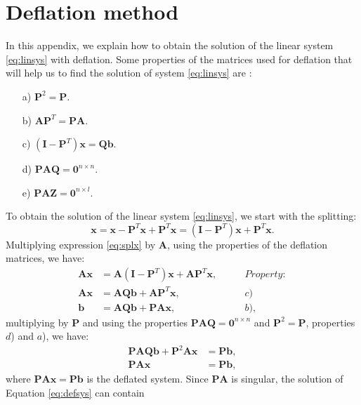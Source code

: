 \documentclass[12pt]{article}
\begin{document}
\section{Deflation method}\label{a4}
In this appendix, we explain how to obtain the solution of the linear system \eqref{eq:linsys} with deflation.
Some properties of the matrices used for deflation that will help us to find the solution of system \eqref{eq:linsys} are \cite{Tang09}:
\begin{enumerate}\label{defprop}
 \item[a)] $\mathbf{P}^2=\mathbf{P}.$
 \item[b)] $\mathbf{A}\mathbf{P}^T=\mathbf{P}\mathbf{A}.$
 \item[c)] $(\mathbf{I}-\mathbf{P}^T)\mathbf{x}=\mathbf{Q}\mathbf{b}.$
 \item[d)]$\mathbf{P}\mathbf{A}\mathbf{Q}=\mathbf{0}^{n\times n}.$
  \item[e)]$\mathbf{P}\mathbf{A}\mathbf{Z}=\mathbf{0}^{n\times l}.$
\end{enumerate}
To obtain the solution of the linear system \eqref{eq:linsys}, we start with the splitting:
\begin{equation}\label{eq:splx}
    \mathbf{x}=\mathbf{x}-\mathbf{P}^T\mathbf{x}+\mathbf{P}^T\mathbf{x}=(\mathbf{I}-\mathbf{P}^T)\mathbf{x}+\mathbf{P}^T\mathbf{x}.
\end{equation}
Multiplying expression \eqref{eq:splx} by $\mathbf{A}$, using the properties of the deflation matrices, we have:
\begin{align*}
\mathbf{A}\mathbf{x}&=\mathbf{A}(\mathbf{I}-\mathbf{P}^T)\mathbf{x}+\mathbf{A}\mathbf{P}^T\mathbf{x},\qquad&Property:\\
\mathbf{A}\mathbf{x}&=\mathbf{A}\mathbf{Q}\mathbf{b}+\mathbf{A}\mathbf{P}^T\mathbf{x},&c)\\
\mathbf{b}&=\mathbf{A}\mathbf{Q}\mathbf{b}+\mathbf{P}\mathbf{A}\mathbf{x},&b),
\end{align*}
multiplying by $\mathbf{P}$ and using the properties $\mathbf{P}\mathbf{A}\mathbf{Q}=
\mathbf{0}^{n\times n}$ and $\mathbf{P}^2=\mathbf{P}$, properties $d$) and $a$), we have:
\begin{align*}
\mathbf{P}\mathbf{A}\mathbf{Q}\mathbf{b}+\mathbf{P}^2\mathbf{A}\mathbf{x}&=\mathbf{P}\mathbf{b},\nonumber \\
\mathbf{P}\mathbf{A}\mathbf{x}&=\mathbf{P}\mathbf{b},
\end{align*}
where $\mathbf{P}\mathbf{A}\mathbf{x}=\mathbf{P}\mathbf{b}$ is the deflated system. Since 
$\mathbf{P}\mathbf{A}$ is singular, the solution of Equation \eqref{eq:defsys} can contain
\end{document}
